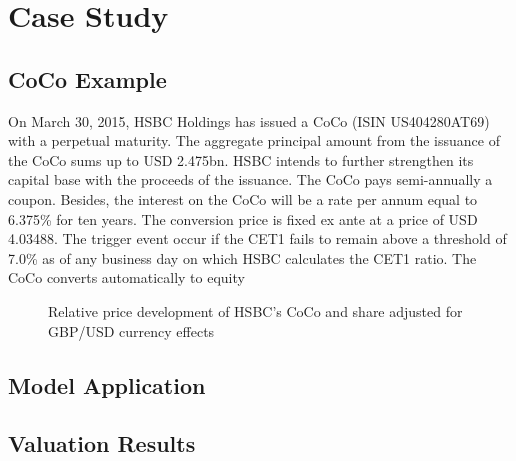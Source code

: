 \chapter{Case Study}\label{empiricalanalysis}

\section{CoCo Example}
On March 30, 2015, HSBC Holdings has issued a CoCo (ISIN US404280AT69) with a perpetual maturity. The aggregate principal amount from the issuance of the CoCo sums up to USD 2.475bn. HSBC intends to further strengthen its capital base with the proceeds of the issuance. The CoCo pays semi-annually a coupon. Besides, the interest on the CoCo will be a rate per annum equal to 6.375\% for ten years. The conversion price is fixed ex ante at a price of USD 4.03488. The trigger event occur if the CET1 fails to remain above a threshold of 7.0\% as of any business day on which HSBC calculates the CET1 ratio. The CoCo converts automatically to equity

\begin{figure}[H]
\centering
{}
\caption[Relative price development of HSBC's CoCo and share]{Relative price development of HSBC's CoCo and share adjusted for GBP/USD currency effects}
\end{figure}

\section{Model Application}

\section{Valuation Results}

